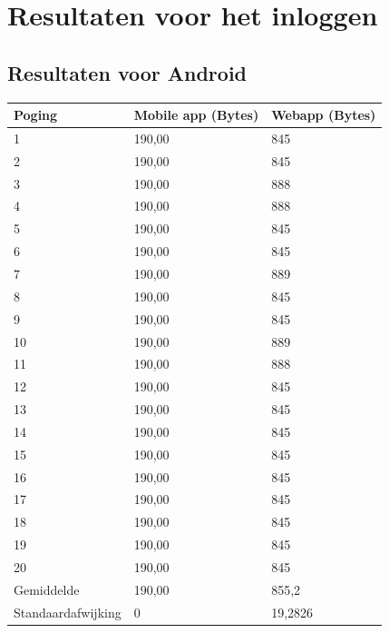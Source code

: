 \documentclass[pdftex,a4paper,12pt,twoside]{report}
\begin{document}
\section{Resultaten voor het inloggen}
\subsection{Resultaten voor Android}
\begin{center}
  \begin{tabular}{ | l | l | l |}
      \hline
      Poging & Mobile app (Bytes) & Webapp (Bytes)
      \\ \hline
      1 & 190,00 & 845
      \\ \hline
      2 & 190,00 & 845
      \\ \hline
      3 & 190,00 & 888
      \\ \hline
      4 & 190,00 & 888
      \\ \hline
      5 & 190,00 & 845
      \\ \hline
      6 & 190,00 & 845
      \\ \hline
      7 & 190,00 & 889
      \\ \hline
      8 & 190,00 & 845
      \\ \hline
      9 & 190,00 & 845
      \\ \hline
      10 & 190,00 & 889
      \\ \hline
      11 & 190,00 & 888
      \\ \hline
      12 & 190,00 & 845
      \\ \hline
      13 & 190,00 & 845
      \\ \hline
      14 & 190,00 & 845
      \\ \hline
      15 & 190,00 & 845
      \\ \hline
      16 & 190,00 & 845
      \\ \hline
      17 & 190,00 & 845
      \\ \hline
      18 & 190,00 & 845
      \\ \hline
      19 & 190,00 & 845
      \\ \hline
      20 & 190,00 & 845
      \\ \hline
      Gemiddelde & 190,00 & 855,2
      \\ \hline
      Standaardafwijking & 0 & 19,2826
      \\ \hline
  \end{tabular}
\end{center}
\newpage
\end{document}
